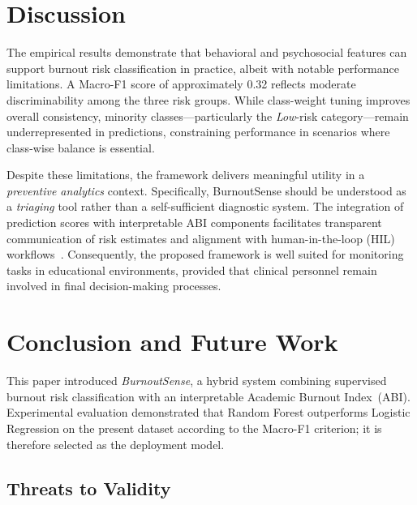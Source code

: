 \documentclass[conference]{IEEEtran}
\begin{document}
\section{Discussion}

The empirical results demonstrate that behavioral and psychosocial features can support burnout risk classification in practice, albeit with notable performance limitations. A Macro-F1 score of approximately 0.32 reflects moderate discriminability among the three risk groups. While class-weight tuning improves overall consistency, minority classes---particularly the \textit{Low}-risk category---remain underrepresented in predictions, constraining performance in scenarios where class-wise balance is essential.

Despite these limitations, the framework delivers meaningful utility in a \textit{preventive analytics} context. Specifically, BurnoutSense should be understood as a \emph{triaging} tool rather than a self-sufficient diagnostic system. The integration of prediction scores with interpretable ABI components facilitates transparent communication of risk estimates and alignment with human-in-the-loop (HIL) workflows~\cite{xai_education, ethics_ai_mental_health}. Consequently, the proposed framework is well suited for monitoring tasks in educational environments, provided that clinical personnel remain involved in final decision-making processes.

\section{Conclusion and Future Work}

This paper introduced \textit{BurnoutSense}, a hybrid system combining supervised burnout risk classification with an interpretable Academic Burnout Index~(ABI). Experimental evaluation demonstrated that Random Forest outperforms Logistic Regression on the present dataset according to the Macro-F1 criterion; it is therefore selected as the deployment model.

\subsection{Threats to Validity}
\end{document}
